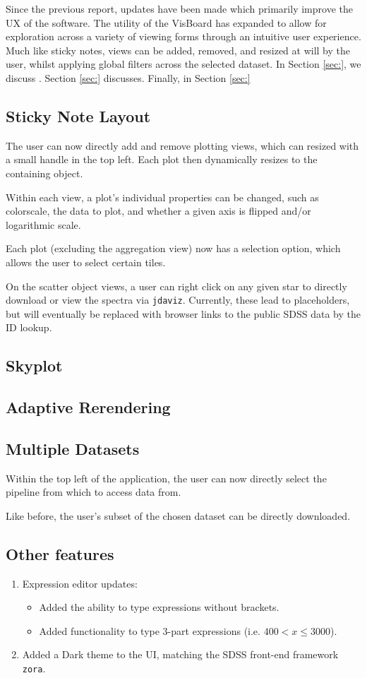 \documentclass[a4paper,10pt,twocolumn]{article}
\begin{document}
Since the previous report, updates have been made which primarily improve the UX of the software. The utility of the VisBoard has expanded to allow for exploration across a variety of viewing forms through an intuitive user experience. Much like sticky notes, views can be added, removed, and resized at will by the user, whilst applying global filters across the selected dataset. In Section \ref{sec:}, we discuss . Section \ref{sec:} discusses. Finally, in Section \ref{sec:}

\subsection{Sticky Note Layout}
\label{sec:sticky}
The user can now directly add and remove plotting views, which can resized with a small handle in the top left.  Each plot then dynamically resizes to the containing object.

Within each view, a plot's individual properties can be changed, such as colorscale, the data to plot, and whether a given axis is flipped and/or logarithmic scale.

Each plot (excluding the aggregation view) now has a selection option, which allows the user to select certain tiles.

On the scatter object views, a user can right click on any given star to directly download or view the spectra via \texttt{jdaviz}. Currently, these lead to placeholders, but will eventually be replaced with browser links to the public SDSS data by the ID lookup.

\subsection{Skyplot}

\subsection{Adaptive Rerendering}
\subsection{Multiple Datasets}
Within the top left of the application, the user can now directly select the pipeline from which to access data from.


Like before, the user's subset of the chosen dataset can be directly downloaded.
\subsection{Other features}
\begin{enumerate}
	\item Expression editor updates:
	      \begin{itemize}
		      \item Added the ability to type expressions without brackets.
		      \item Added functionality to type 3-part expressions (i.e. $400 < x \le 3000$).
	      \end{itemize}
	\item Added a Dark theme to the UI, matching the SDSS front-end framework \texttt{zora}.
\end{enumerate}
\end{document}
